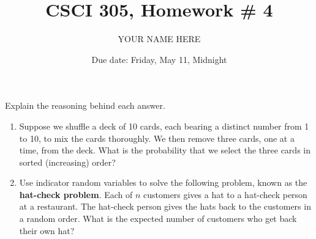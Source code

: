 \documentclass{article}
\title{CSCI 305, Homework \# 4}
\author{YOUR NAME HERE}
\date{Due date:  Friday, May 11, Midnight}
\begin{document}
\maketitle

Explain the reasoning behind each answer.

\begin{enumerate}

\item
  Suppose we shuffle a deck of 10 cards, each bearing a distinct
  number from 1 to 10, to mix the cards thoroughly.  We then remove
  three cards, one at a time, from the deck.  What is the probability
  that we select the three cards in sorted (increasing) order?

\item
  Use indicator random variables to solve the following problem,
  known as the {\bf hat-check problem}.
  Each of $n$ customers gives a hat to a hat-check person at a
  restaurant.  The hat-check person gives the hats back to the customers
  in a random order.  What is the expected number of customers who get
  back their own hat?

\end{enumerate}
\end{document}
